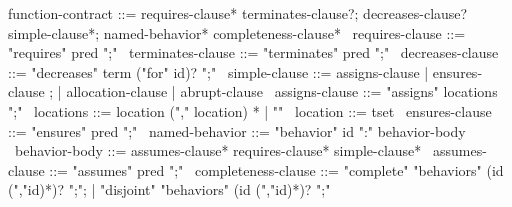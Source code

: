 \begin{syntax}
  function-contract ::= requires-clause* terminates-clause?;
                        decreases-clause? simple-clause*;
                        named-behavior* completeness-clause*
  \
  requires-clause ::= "requires" pred ";"
  \
  terminates-clause ::= "terminates" pred ";"
  \
  decreases-clause ::= "decreases" term ("for" id)? ";"
  \
  simple-clause ::= assigns-clause | ensures-clause ;
                | allocation-clause | abrupt-clause 
  \
  assigns-clause ::= "assigns" locations ";"
  \
  locations ::= location ("," location) * | "\nothing"
  \
  location ::= tset
  \
  ensures-clause ::= "ensures" pred ";"
  \
  named-behavior ::= "behavior" id ":" behavior-body
  \
  behavior-body ::= assumes-clause* requires-clause* simple-clause* 
  \
  assumes-clause ::= "assumes" pred ";"
  \
  completeness-clause ::= "complete" "behaviors" (id (","id)*)? ";";
     | "disjoint" "behaviors" (id (","id)*)? ";"
\end{syntax}
